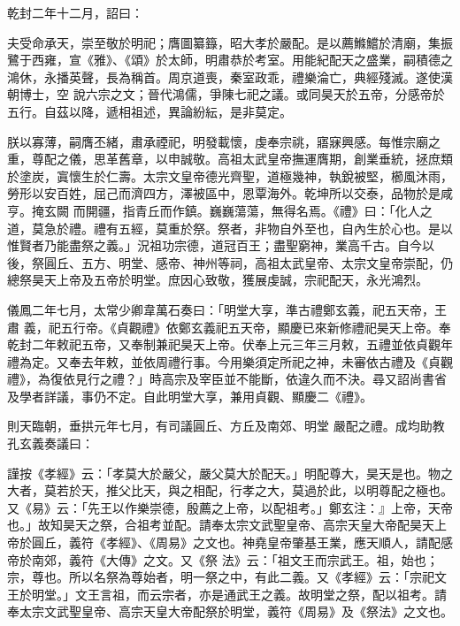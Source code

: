 \begin{pinyinscope}
 乾封二年十二月，詔曰：



 夫受命承天，崇至敬於明祀；膺圖纂籙，昭大孝於嚴配。是以薦鰷鱨於清廟，集振鷺于西雍，宣《雅》、《頌》於太師，明肅恭於考室。用能紀配天之盛業，嗣積德之鴻休，永播英聲，長為稱首。周京道喪，秦室政乖，禮樂淪亡，典經殘滅。遂使漢朝博士，空
 說六宗之文；晉代鴻儒，爭陳七祀之議。或同昊天於五帝，分感帝於五行。自茲以降，遞相祖述，異論紛紜，是非莫定。



 朕以寡薄，嗣膺丕緒，肅承禋祀，明發載懷，虔奉宗祧，寤寐興感。每惟宗廟之重，尊配之儀，思革舊章，以申誠敬。高祖太武皇帝撫運膺期，創業垂統，拯庶類於塗炭，寘懷生於仁壽。太宗文皇帝德光齊聖，道極幾神，執銳被堅，櫛風沐雨，勞形以安百姓，屈己而濟四方，澤被區中，恩覃海外。乾坤所以交泰，品物於是咸亨。掩玄闕
 而開疆，指青丘而作鎮。巍巍蕩蕩，無得名焉。《禮》曰：「化人之道，莫急於禮。禮有五經，莫重於祭。祭者，非物自外至也，自內生於心也。是以惟賢者乃能盡祭之義。」況祖功宗德，道冠百王；盡聖窮神，業高千古。自今以後，祭圓丘、五方、明堂、感帝、神州等祠，高祖太武皇帝、太宗文皇帝崇配，仍總祭昊天上帝及五帝於明堂。庶因心致敬，獲展虔誠，宗祀配天，永光鴻烈。



 儀鳳二年七月，太常少卿韋萬石奏曰：「明堂大享，準古禮鄭玄義，祀五天帝，王肅
 義，祀五行帝。《貞觀禮》依鄭玄義祀五天帝，顯慶已來新修禮祀昊天上帝。奉乾封二年敕祀五帝，又奉制兼祀昊天上帝。伏奉上元三年三月敕，五禮並依貞觀年禮為定。又奉去年敕，並依周禮行事。今用樂須定所祀之神，未審依古禮及《貞觀禮》，為復依見行之禮？」時高宗及宰臣並不能斷，依違久而不決。尋又詔尚書省及學者詳議，事仍不定。自此明堂大享，兼用貞觀、顯慶二《禮》。



 則天臨朝，垂拱元年七月，有司議圓丘、方丘及南郊、明堂
 嚴配之禮。成均助教孔玄義奏議曰：



 謹按《孝經》云：「孝莫大於嚴父，嚴父莫大於配天。」明配尊大，昊天是也。物之大者，莫若於天，推父比天，與之相配，行孝之大，莫過於此，以明尊配之極也。又《易》云：「先王以作樂崇德，殷薦之上帝，以配祖考。」鄭玄注：』上帝，天帝也。」故知昊天之祭，合祖考並配。請奉太宗文武聖皇帝、高宗天皇大帝配昊天上帝於圓丘，義符《孝經》、《周易》之文也。神堯皇帝肇基王業，應天順人，請配感帝於南郊，義符《大傳》之文。又《祭
 法》云：「祖文王而宗武王。祖，始也；宗，尊也。所以名祭為尊始者，明一祭之中，有此二義。又《孝經》云：「宗祀文王於明堂。」文王言祖，而云宗者，亦是通武王之義。故明堂之祭，配以祖考。請奉太宗文武聖皇帝、高宗天皇大帝配祭於明堂，義符《周易》及《祭法》之文也。




\end{pinyinscope}
